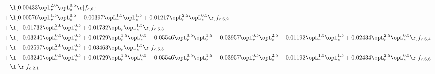 \begin{alignat}{2}
& - \l[  0.00433 \opL_r^{2.0} \opL_z^{0.5}  \r] f_{c,6,1} \nonumber \\ 
& + \l[  0.00576 \opL_r^{1.5} \opL_z^{0.5}   -0.00397 \opL_r^{1.5} \opL_z^{1.5} +  0.01217 \opL_r^{2.5} \opL_z^{0.5}  \r] f_{c,6,2} \nonumber \\ 
& + \l[  -0.01732 \opL_r^{2.0} \opL_z^{0.5} +  0.01732 \opL_r \opL_z^{1.5}  \r] f_{c,6,3} \nonumber \\ 
& + \l[  -0.03240 \opL_r^{0.5} \opL_z^{0.5} +  0.01729 \opL_r^{1.5} \opL_z^{0.5}   -0.05546 \opL_r^{0.5} \opL_z^{1.5}   -0.03957 \opL_r^{0.5} \opL_z^{2.5}   -0.01192 \opL_r^{1.5} \opL_z^{1.5} +  0.02434 \opL_r^{2.5} \opL_z^{0.5}  \r] f_{c,6,4} \nonumber \\ 
& + \l[  -0.02597 \opL_r^{2.0} \opL_z^{0.5} +  0.03463 \opL_r \opL_z^{1.5}  \r] f_{c,6,5} \nonumber \\ 
& + \l[  -0.03240 \opL_r^{0.5} \opL_z^{0.5} +  0.01729 \opL_r^{1.5} \opL_z^{0.5}   -0.05546 \opL_r^{0.5} \opL_z^{1.5}   -0.03957 \opL_r^{0.5} \opL_z^{2.5}   -0.01192 \opL_r^{1.5} \opL_z^{1.5} +  0.02434 \opL_r^{2.5} \opL_z^{0.5}  \r] f_{c,6,6} \nonumber \\ 
& - \l[  \r] f_{c,2,1} \nonumber \\ 
\end{alignat} 


